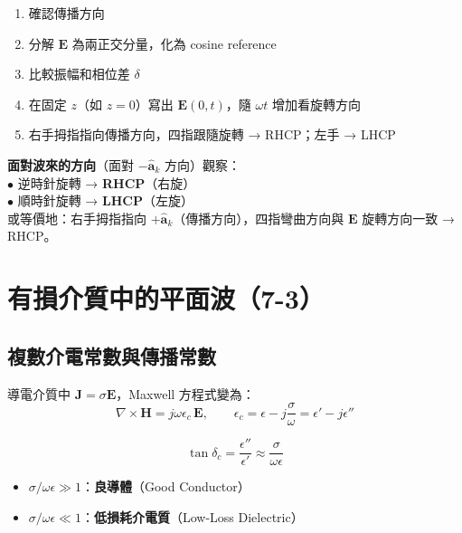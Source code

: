 \documentclass[12pt,a4paper]{article}
\newcommand{\vE}{\mathbf{E}}
\newcommand{\vH}{\mathbf{H}}
\newcommand{\vJ}{\mathbf{J}}
\newcommand{\ak}{\hat{\mathbf{a}}_k}
\begin{document}
\begin{tipbox}[極化判定步驟]
\begin{enumerate}[nosep]
  \item 確認傳播方向
  \item 分解 $\vE$ 為兩正交分量，化為 cosine reference
  \item 比較振幅和相位差 $\delta$
  \item 在固定 $z$（如 $z=0$）寫出 $\vE(0,t)$，隨 $\omega t$ 增加看旋轉方向
  \item 右手拇指指向傳播方向，四指跟隨旋轉 → RHCP；左手 → LHCP
\end{enumerate}
\end{tipbox}

\begin{warnbox}[極化旋向的物理判定法]
\textbf{面對波來的方向}（面對 $-\ak$ 方向）觀察：\\
$\bullet$ 逆時針旋轉 → \textbf{RHCP}（右旋）\\
$\bullet$ 順時針旋轉 → \textbf{LHCP}（左旋）\\[4pt]
或等價地：右手拇指指向 $+\ak$（傳播方向），四指彎曲方向與 $\vE$ 旋轉方向一致 → RHCP。
\end{warnbox}

\section{有損介質中的平面波（7-3）}

\subsection{複數介電常數與傳播常數}

導電介質中 $\vJ = \sigma\vE$，Maxwell 方程式變為：
\[
\nabla\times\vH = j\omega\epsilon_c\,\vE, \qquad
\epsilon_c = \epsilon - j\frac{\sigma}{\omega} = \epsilon' - j\epsilon''
\]

\begin{keybox}
\[
\tan\delta_c = \frac{\epsilon''}{\epsilon'} \approx \frac{\sigma}{\omega\epsilon}
\]
\begin{itemize}[nosep]
  \item $\sigma/\omega\epsilon \gg 1$：\textbf{良導體}（Good Conductor）
  \item $\sigma/\omega\epsilon \ll 1$：\textbf{低損耗介電質}（Low-Loss Dielectric）
\end{itemize}
\end{keybox}
\end{document}
